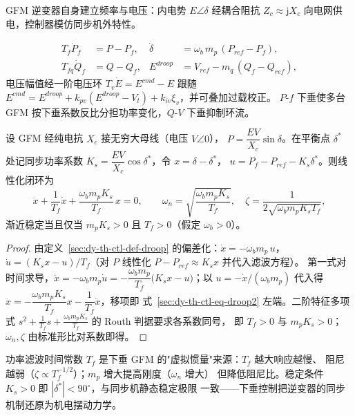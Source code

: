 GFM 逆变器自身建立频率与电压：内电势 $E\angle\delta$ 经耦合阻抗
$Z_c\approx\mathrm jX_c$ 向电网供电，控制器模仿同步机外特性。

\begin{definition}[功率滤波下垂控制]\label{sec:dy-th-ctl-def-droop}
\begin{align}
T_f\dot P_f &= P-P_f, & \dot\delta &= \omega_b\,m_p\,(P_{ref}-P_f),\\
T_{fq}\dot Q_f &= Q-Q_f, & E^{droop} &= V_{ref}-m_q\,(Q_f-Q_{ref}),
\label{sec:dy-th-ctl-eq-droop}
\end{align}
电压幅值经一阶电压环 $T_v\dot E=E^{cmd}-E$ 跟随
$E^{cmd}=E^{droop}+k_{pv}(E^{droop}-V_t)+k_{iv}\xi_v$，并可叠加过载校正。
$P$-$f$ 下垂使多台 GFM 按下垂系数反比分担功率变化，$Q$-$V$ 下垂抑制环流。
\end{definition}

\begin{theorem}\label{sec:dy-th-ctl-thm-droop}
设 GFM 经纯电抗 $X_c$ 接无穷大母线（电压 $V\angle0$），
$P=\dfrac{EV}{X_c}\sin\delta$。在平衡点 $\delta^*$ 处记同步功率系数
$K_s=\dfrac{EV}{X_c}\cos\delta^*$，令 $x=\delta-\delta^*$，
$u=P_f-P_{ref}-K_s\delta^*$。则线性化闭环为
\begin{equation}
\ddot x+\frac{1}{T_f}\dot x+\frac{\omega_b m_p K_s}{T_f}\,x=0,
\qquad
\omega_n=\sqrt{\frac{\omega_b m_p K_s}{T_f}},\quad
\zeta=\frac{1}{2\sqrt{\omega_b m_p K_s T_f}},
\label{sec:dy-th-ctl-eq-droop2}
\end{equation}
渐近稳定当且仅当 $m_pK_s>0$ 且 $T_f>0$（假定 $\omega_b>0$）。
\end{theorem}

\begin{proof}
由定义~\ref{sec:dy-th-ctl-def-droop} 的偏差化：$\dot x=-\omega_b m_p\,u$，
$\dot u=(K_s x-u)/T_f$（对 $P$ 线性化 $P-P_{ref}\approx K_s x$ 并代入滤波方程）。
第一式对时间求导，$\ddot x=-\omega_b m_p\dot u=-\dfrac{\omega_b m_p}{T_f}
\bigl(K_s x-u\bigr)$；以 $u=-\dot x/(\omega_b m_p)$ 代入得
$\ddot x=-\dfrac{\omega_b m_p K_s}{T_f}x-\dfrac{1}{T_f}\dot x$，移项即
式~\eqref{sec:dy-th-ctl-eq-droop2} 左端。二阶特征多项式
$s^2+\frac{1}{T_f}s+\frac{\omega_bm_pK_s}{T_f}$ 的 Routh 判据要求各系数同号，
即 $T_f>0$ 与 $m_pK_s>0$；$\omega_n,\zeta$ 由标准形比对系数即得。
\end{proof}

\begin{remark}[物理解释]
功率滤波时间常数 $T_f$ 是下垂 GFM 的"虚拟惯量"来源：$T_f$ 越大响应越慢、
阻尼越弱（$\zeta\propto T_f^{-1/2}$）；$m_p$ 增大提高刚度（$\omega_n$ 增大）
但降低阻尼比。稳定条件 $K_s>0$ 即 $|\delta^*|<90^{\circ}$，与同步机静态稳定极限
一致——下垂控制把逆变器的同步机制还原为机电摆动力学。
\end{remark}

